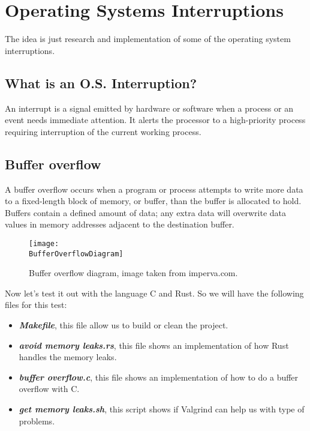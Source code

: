 \section{Operating Systems Interruptions}

The idea is just research and implementation of some of the operating system interruptions.

\subsection{What is an O.S. Interruption?}

An interrupt is a signal emitted by hardware or software when a process or an event needs immediate
attention. It alerts the processor to a high-priority process requiring interruption of the current
working process.

\subsection{Buffer overflow}

A buffer overflow occurs when a program or process attempts to write more data to a fixed-length
block of memory, or buffer, than the buffer is allocated to hold. Buffers contain a defined amount
of data; any extra data will overwrite data values in memory addresses adjacent to the destination
buffer.

\begin{figure}[h]
    \centering
    \texttt{[image: \\BufferOverflowDiagram]}
    \caption{Buffer overflow diagram, image taken from imperva.com.}
\end{figure}

\vspace{0.2cm}

Now let's test it out with the language C and Rust. So we will have the following files for this
test:

\begin{itemize}
    \item \textit{\textbf{Makefile}}, this file allow us to build or clean the project.
    \item \textit{\textbf{avoid memory leaks.rs}}, this file shows an implementation of how Rust handles the memory leaks.
    \item \textit{\textbf{buffer overflow.c}}, this file shows an implementation of how to do a buffer overflow with C.
    \item \textit{\textbf{get memory leaks.sh}}, this script shows if Valgrind can help us with type
    of problems.
\end{itemize}

